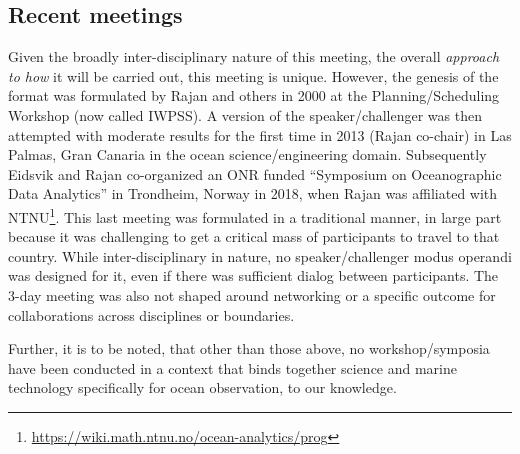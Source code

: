 \subsection{Recent meetings}

Given the broadly inter-disciplinary nature of this meeting, the overall
\emph{approach to how} it will be carried out, this meeting is
unique. However, the genesis of the format was formulated by Rajan and
others in 2000 at the \nas Planning/Scheduling Workshop (now called
IWPSS). A version of the speaker/challenger was then attempted with
moderate results for the first time in 2013 (Rajan co-chair) in Las
Palmas, Gran Canaria in the ocean science/engineering
domain. Subsequently Eidsvik and Rajan co-organized an ONR funded
``Symposium on Oceanographic Data Analytics'' in Trondheim, Norway in
2018, when Rajan was affiliated with
NTNU\footnote{\url{https://wiki.math.ntnu.no/ocean-analytics/prog}}. This
last meeting was formulated in a traditional manner, in large part
because it was challenging to get a critical mass of participants to
travel to that country. While inter-disciplinary in nature, no
speaker/challenger modus operandi was designed for it, even if there was
sufficient dialog between participants. The 3-day meeting was also not
shaped around networking or a specific outcome for collaborations across
disciplines or boundaries.

Further, it is to be noted, that other than those above, no
workshop/symposia have been conducted in a context that binds together
science and marine technology specifically for ocean observation, to
our knowledge.
